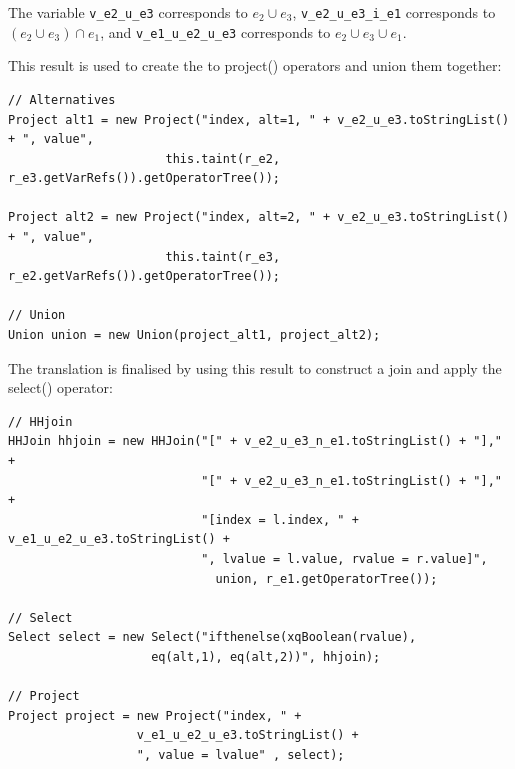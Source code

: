 The variable \texttt{v\_e2\_u\_e3} corresponds to $e_2 \cup e_3$, \texttt{v\_e2\_u\_e3\_i\_e1} corresponds to
$(e_2 \cup e_3) \cap e_1$, and \texttt{v\_e1\_u\_e2\_u\_e3} corresponds to $e_2 \cup e_3 \cup
e_1$.

This result is used to create the to \textsf{project()} operators and union
them together:

\begin{Verbatim}
// Alternatives
Project alt1 = new Project("index, alt=1, " + v_e2_u_e3.toStringList() + ", value", 
                      this.taint(r_e2, r_e3.getVarRefs()).getOperatorTree()); 

Project alt2 = new Project("index, alt=2, " + v_e2_u_e3.toStringList() + ", value", 
                      this.taint(r_e3, r_e2.getVarRefs()).getOperatorTree()); 

// Union
Union union = new Union(project_alt1, project_alt2);
\end{Verbatim}

The translation is finalised by using this result to construct a join and apply
the \textsf{select()} operator:

\begin{Verbatim}
// HHjoin
HHJoin hhjoin = new HHJoin("[" + v_e2_u_e3_n_e1.toStringList() + "]," +
                           "[" + v_e2_u_e3_n_e1.toStringList() + "]," + 
                           "[index = l.index, " + v_e1_u_e2_u_e3.toStringList() +
                           ", lvalue = l.value, rvalue = r.value]", 
                             union, r_e1.getOperatorTree());

// Select
Select select = new Select("ifthenelse(xqBoolean(rvalue), 
                    eq(alt,1), eq(alt,2))", hhjoin);

// Project
Project project = new Project("index, " + 
                  v_e1_u_e2_u_e3.toStringList() +
                  ", value = lvalue" , select);
\end{Verbatim}
